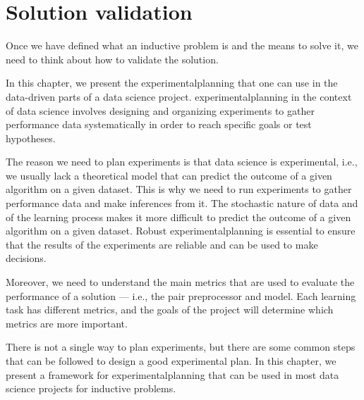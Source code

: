 \chapter{Solution validation}
\label{chap:planning}
\glsresetall


Once we have defined what an inductive problem is and the means to solve it, we need to
think about how to validate the solution.

In this chapter, we present the \gls{experimentalplanning} that one can use in the data-driven
parts of a data science project.  \Gls{experimentalplanning} in the context of data
science involves designing and organizing experiments to gather performance data
systematically in order to reach specific goals or test hypotheses.

The reason we need to plan experiments is that data science is experimental, i.e., we
usually lack a theoretical model that can predict the outcome of a given algorithm on a
given dataset.  This is why we need to run experiments to gather performance data and make
inferences from it.  The stochastic nature of data and of the learning process makes it
more difficult to predict the outcome of a given algorithm on a given dataset.  Robust
\gls{experimentalplanning} is essential to ensure that the results of the experiments are
reliable and can be used to make decisions.

Moreover, we need to understand the main metrics that are used to evaluate the performance
of a solution --- i.e., the pair \gls{preprocessor} and \gls{model}.  Each learning task has different
metrics, and the goals of the project will determine which metrics are more important.

There is not a single way to plan experiments, but there are some common steps that can
be followed to design a good experimental plan.  In this chapter, we present a
framework for \gls{experimentalplanning} that can be used in most data science projects
for inductive problems.

